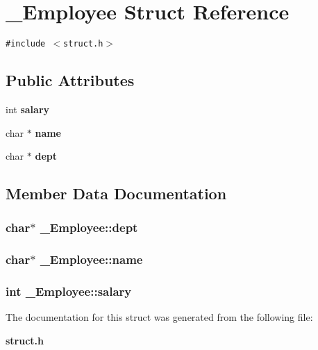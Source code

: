 \section{\_\-Employee Struct Reference}
\label{struct__Employee}
{\tt \#include $<$struct.h$>$}

\subsection*{Public Attributes}
\begin{CompactItemize}
\item 
int \bf{salary}
\item 
char $\ast$ \bf{name}
\item 
char $\ast$ \bf{dept}
\end{CompactItemize}


\subsection{Member Data Documentation}
\subsubsection{\setlength{\rightskip}{0pt plus 5cm}char$\ast$ \bf{\_\-Employee::dept}}\label{struct__Employee_632c8a59c7e12796aa7c963bc940adee}


\subsubsection{\setlength{\rightskip}{0pt plus 5cm}char$\ast$ \bf{\_\-Employee::name}}\label{struct__Employee_5995e10100ca0ed473ac53741bdd4c32}


\subsubsection{\setlength{\rightskip}{0pt plus 5cm}int \bf{\_\-Employee::salary}}\label{struct__Employee_c326f9bd5d7647060effee3af87a8ed5}




The documentation for this struct was generated from the following file:\begin{CompactItemize}
\item 
\bf{struct.h}\end{CompactItemize}
